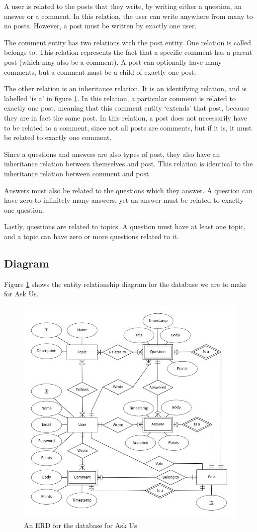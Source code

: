 A user is related to the posts that they write, by writing either a question, an answer or a comment. In this relation, the user can write anywhere from many to no posts. However, a post must be written by exactly one user.

The comment entity has two relations with the post entity. One relation is called belongs to. This relation represents the fact that a specific comment has a parent post (which may also be a comment). A post can optionally have many comments, but a comment must be a child of exactly one post.

The other relation is an inheritance relation. It is an identifying relation, and is labelled `is a' in figure \ref{erd}. In this relation, a particular comment is related to exactly one post, meaning that this comment entity `extends' that post, because they are in fact the same post. In this relation, a post does not necessarily have to be related to a comment, since not all posts are comments, but if it is, it must be related to exactly one comment.

Since a questions and answers are also types of post, they also have an inheritance relation between themselves and post. This relation is identical to the inheritance relation between comment and post.

Answers must also be related to the questions which they answer. A question can have zero to infinitely many answers, yet an answer must be related to exactly one question.

Lastly, questions are related to topics. A question must have at least one topic, and a topic can have zero or more questions related to it.

\subsection{Diagram}

Figure \ref{erd} shows the entity relationship diagram for the database we are to make for Ask Us.

\begin{figure}[p]
	\centering
	\includegraphics[width=\linewidth]{../../ERD/erd.png}
	\caption{An ERD for the database for Ask Us}
	\label{erd}
\end{figure}